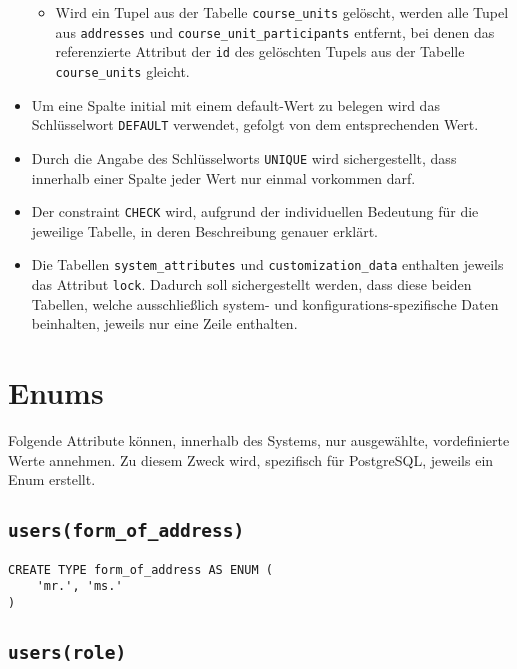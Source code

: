 \begin{itemize}
\begin{itemize}
\item Wird ein Tupel aus der Tabelle \texttt{course\_units} gelöscht, werden alle Tupel aus \texttt{addresses} und \texttt{course\_unit\_participants} entfernt, bei denen das referenzierte Attribut der \texttt{id} des gelöschten Tupels aus der Tabelle \texttt{course\_units} gleicht.
\end{itemize}

\item Um eine Spalte initial mit einem default-Wert zu belegen wird das Schlüsselwort \texttt{DEFAULT} verwendet, gefolgt von dem entsprechenden Wert.

\item Durch die Angabe des Schlüsselworts \texttt{UNIQUE} wird sichergestellt, dass innerhalb einer Spalte jeder Wert nur einmal vorkommen darf.

\item Der constraint \texttt{CHECK} wird, aufgrund der individuellen Bedeutung für die jeweilige Tabelle, in deren Beschreibung genauer erklärt.

\item Die Tabellen \texttt{system\_attributes} und \texttt{customization\_data} enthalten jeweils das Attribut \texttt{lock}. Dadurch soll sichergestellt werden, dass diese beiden Tabellen, welche ausschließlich system- und konfigurations-spezifische Daten beinhalten, jeweils nur eine Zeile enthalten.

\end{itemize}

\section{Enums}
Folgende Attribute können, innerhalb des Systems, nur ausgewählte, vordefinierte Werte annehmen. Zu diesem Zweck wird, spezifisch für PostgreSQL, jeweils ein Enum erstellt.

\subsection{\texttt{users(form\_of\_address)}}

\begin{verbatim}
CREATE TYPE form_of_address AS ENUM (
    'mr.', 'ms.'
)
\end{verbatim}

\subsection{\texttt{users(role)}}

